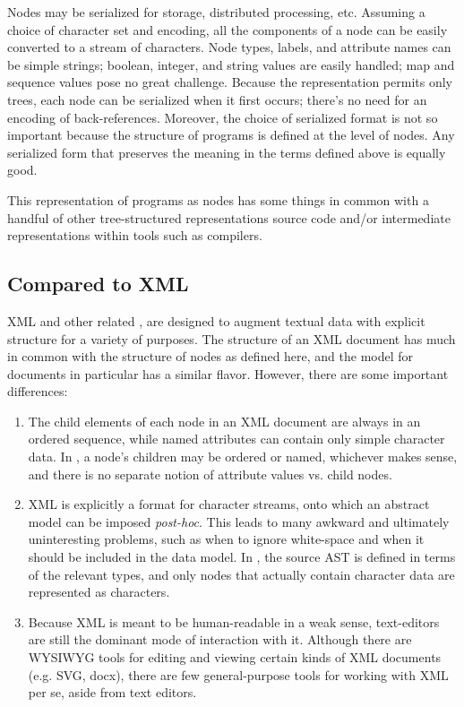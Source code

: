 Nodes may be serialized for storage, distributed processing, etc. Assuming a choice of character set and encoding, all the components of a node can be easily converted to a stream of characters. Node types, labels, and attribute names can be simple strings; boolean, integer, and string values are easily handled; map and sequence values pose no great challenge. Because the representation permits only trees, each node can be serialized when it first occurs; there's no need for an encoding of back-references. Moreover, the choice of serialized format is not so important because the structure of programs is defined at the level of nodes. Any serialized form that preserves the meaning in the terms defined above is equally good.

This representation of programs as nodes has some things in common with a handful of other tree-structured representations source code and/or intermediate representations within tools such as compilers.

\subsection{Compared to XML}
XML and other related , are designed to augment textual data with explicit structure for a variety of purposes. The structure of an XML document has much in common with the structure of nodes as defined here, and the \cite{infoset} model for documents in particular has a similar flavor. However, there are some important differences:
\begin{enumerate}
\item The child elements of each node in an XML document are always in an ordered sequence, while named attributes can contain only simple character data. In \Meta, a node's children may be ordered or named, whichever makes sense, and there is no separate notion of attribute values vs. child nodes.
\item XML is explicitly a format for character streams, onto which an abstract model can be imposed \textit{post-hoc}. This leads to many awkward and ultimately uninteresting problems, such as when to ignore white-space and when it should be included in the data model. In \Meta, the source AST is defined in terms of the relevant types, and only nodes that actually contain character data are represented as characters.
\item Because XML is meant to be human-readable in a weak sense, text-editors are still the dominant mode of interaction with it. Although there are WYSIWYG tools for editing and viewing certain kinds of XML documents (e.g. SVG\cite{svg}, docx\cite{openoffice}), there are few general-purpose tools for working with XML per se, aside from text editors.
\end{enumerate}

